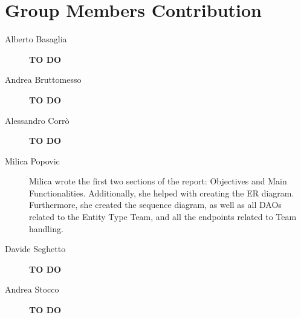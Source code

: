 \section{Group Members Contribution}


\begin{description}
	\item[Alberto Basaglia] \textbf{TO DO}
	\item[Andrea Bruttomesso] \textbf{TO DO}
	\item[Alessandro Corrò] \textbf{TO DO}
	\item[Milica Popovic]
Milica wrote the first two sections of the report: Objectives and Main Functionalities. Additionally, she helped with creating the ER diagram. Furthermore, she created the sequence diagram, as well as all DAOs related to the Entity Type Team, and all the endpoints related to Team handling.
	\item[Davide Seghetto] \textbf{TO DO}
	\item[Andrea Stocco] \textbf{TO DO}
\end{description}
